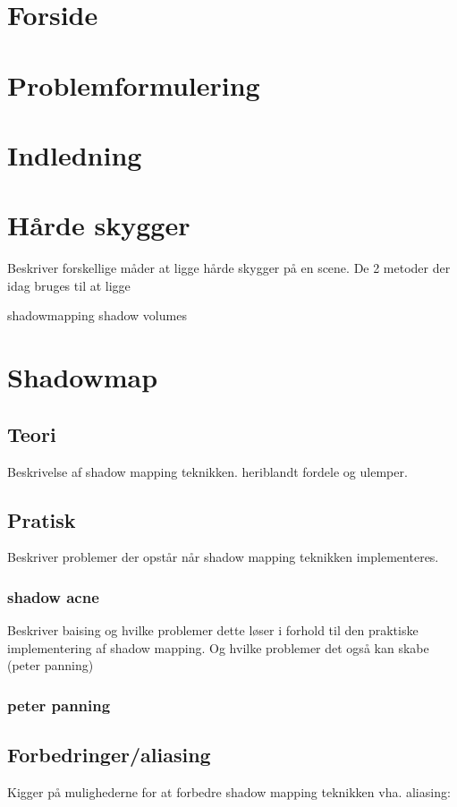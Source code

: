 \documentclass[11pt,a4paper]{article}
\begin{document}
\section{Forside}

\section{Problemformulering}

\section{Indledning}


\section{Hårde skygger}
Beskriver forskellige måder at ligge hårde skygger på en scene. De 2 metoder der idag bruges til at ligge 

shadowmapping
 shadow volumes

\section{Shadowmap}

\subsection{Teori}
Beskrivelse af shadow mapping teknikken. heriblandt fordele og ulemper.

\subsection{Pratisk}
Beskriver problemer der opstår når shadow mapping teknikken implementeres.
 
\subsubsection{shadow acne}
Beskriver  baising og hvilke problemer dette løser i forhold til den praktiske implementering af shadow mapping. Og hvilke problemer det også kan skabe (peter panning)
\subsubsection{peter panning}

\subsection{Forbedringer/aliasing}
Kigger på mulighederne for at forbedre shadow mapping teknikken vha. aliasing:
\end{document}
